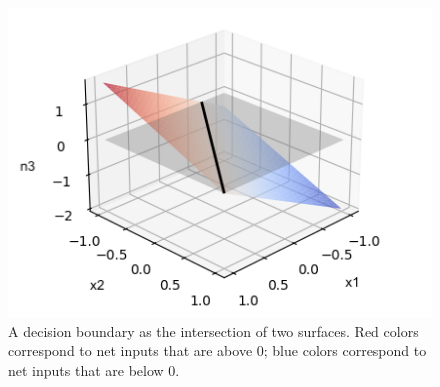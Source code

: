 \begin{figure}[h]
\centering
\includegraphics[scale=1.0]{./images/decisionLinePlanes.png}
\caption{A decision boundary as the intersection of two surfaces. Red colors correspond to net inputs that are above 0; blue colors correspond to net inputs that are below 0.}
\label{decisionLineSurface}
\end{figure}

